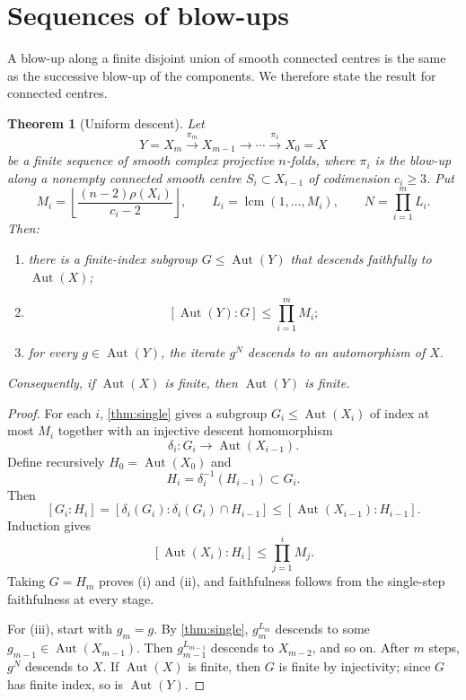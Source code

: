 \documentclass[11pt,reqno]{amsart}
\DeclareMathOperator{\Aut}{Aut}
\DeclareMathOperator{\lcm}{lcm}
\newtheorem{theorem}{Theorem}[section]
\theoremstyle{remark}
\begin{document}
\section{Sequences of blow-ups}

A blow-up along a finite disjoint union of smooth connected centres is the same as the successive blow-up of the components.  We therefore state the result for connected centres.

\begin{theorem}[Uniform descent]\label{thm:sequence}
Let
\[
 Y=X_m\xrightarrow{\pi_m}X_{m-1}\longrightarrow\cdots
 \xrightarrow{\pi_1}X_0=X
\]
be a finite sequence of smooth complex projective $n$-folds, where $\pi_i$ is the blow-up along a nonempty connected smooth centre $S_i\subset X_{i-1}$ of codimension $c_i\ge3$.  Put
\[
 M_i=
 \left\lfloor
 \frac{(n-2)\rho(X_i)}{c_i-2}
 \right\rfloor,
 \qquad
 L_i=\lcm(1,\ldots,M_i),
 \qquad
 N=\prod_{i=1}^m L_i.
\]
Then:
\begin{enumerate}[label=\textup{(\roman*)}]
\item there is a finite-index subgroup $G\le\Aut(Y)$ that descends faithfully to $\Aut(X)$;
\item
\[
 [\Aut(Y):G]\le\prod_{i=1}^m M_i;
\]
\item for every $g\in\Aut(Y)$, the iterate $g^N$ descends to an automorphism of $X$.
\end{enumerate}
Consequently, if $\Aut(X)$ is finite, then $\Aut(Y)$ is finite.
\end{theorem}

\begin{proof}
For each $i$, \cref{thm:single} gives a subgroup $G_i\le\Aut(X_i)$ of index at most $M_i$ together with an injective descent homomorphism
\[
 \delta_i\colon G_i\longrightarrow\Aut(X_{i-1}).
\]
Define recursively $H_0=\Aut(X_0)$ and
\[
 H_i=\delta_i^{-1}(H_{i-1})\subset G_i.
\]
Then
\[
 [G_i:H_i]
 =[\delta_i(G_i):\delta_i(G_i)\cap H_{i-1}]
 \le[\Aut(X_{i-1}):H_{i-1}].
\]
Induction gives
\[
 [\Aut(X_i):H_i]\le\prod_{j=1}^iM_j.
\]
Taking $G=H_m$ proves (i) and (ii), and faithfulness follows from the single-step faithfulness at every stage.

For (iii), start with $g_m=g$.  By \cref{thm:single}, $g_m^{L_m}$ descends to some $g_{m-1}\in\Aut(X_{m-1})$.  Then $g_{m-1}^{L_{m-1}}$ descends to $X_{m-2}$, and so on.  After $m$ steps, $g^N$ descends to $X$.  If $\Aut(X)$ is finite, then $G$ is finite by injectivity; since $G$ has finite index, so is $\Aut(Y)$.
\end{proof}
\end{document}
